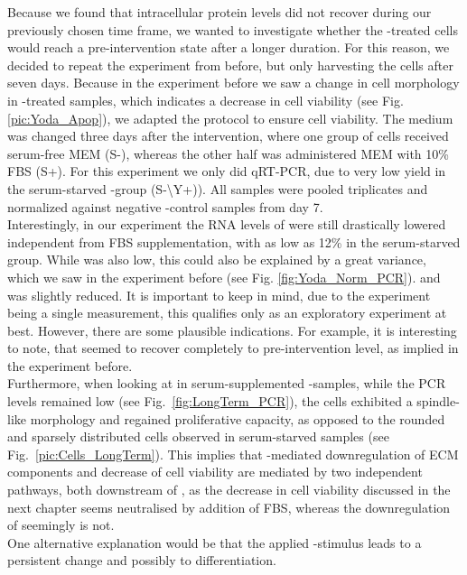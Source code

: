 Because we found that intracellular \colone{} protein levels did not recover during our previously chosen time frame, we wanted to investigate whether the \Yoda{}-treated cells would reach a pre-intervention state after a longer duration. For this reason, we decided to repeat the experiment from before, but only harvesting the cells after seven days. Because in the experiment before we saw a change in cell morphology in \Yoda{}-treated samples, which indicates a decrease in cell viability (see Fig. \ref{pic:Yoda_Apop}), we adapted the protocol to ensure cell viability. The medium was changed three days after the intervention, where one group of cells received serum-free MEM\textalpha{} (S-), whereas the other half was administered MEM\textalpha{} with 10\% FBS (S+). For this experiment we only did qRT-PCR, due to very low yield in the serum-starved \Yoda{}-group (S-\textbackslash{}Y+)). All samples were pooled triplicates and normalized against negative \Yoda{}-control samples from day 7.\\
Interestingly, in our experiment the RNA levels of \colone{} were still drastically lowered independent from FBS supplementation, with as low as 12\% in the serum-starved group. While \colthreeGene{} was also low, this could also be explained by a great variance, which we saw in the experiment before (see Fig. \ref{fig:Yoda_Norm_PCR}). \ILGene{} and \FnGene{} was slightly reduced. It is important to keep in mind, due to the experiment being a single measurement, this qualifies only as an exploratory experiment at best. However, there are some plausible indications. For example, it is interesting to note, that \ILGene{} seemed to recover completely to pre-intervention level, as implied in the experiment before. \\
Furthermore, when looking at \coloneGene{} in serum-supplemented \Yoda{}-samples, while the PCR levels remained low (see Fig.~\vref{fig:LongTerm_PCR}), the cells exhibited a spindle-like morphology and regained proliferative capacity, as opposed to the rounded and sparsely distributed cells observed in serum-starved samples (see Fig.~\ref{pic:Cells_LongTerm}). This implies that \Piezo{}-mediated downregulation of ECM components and decrease of cell viability are mediated by two independent pathways, both downstream of \Piezo{}, as the decrease in cell viability discussed in the next chapter seems neutralised by addition of FBS, whereas the downregulation of \coloneGene{} seemingly is not.\\
One alternative explanation would be that the applied \Yoda{}-stimulus leads to a persistent change and possibly to differentiation.\par

